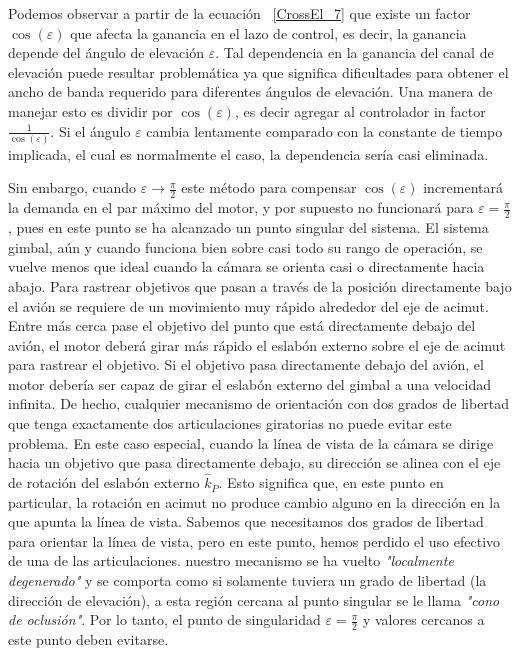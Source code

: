 Podemos observar a partir de la ecuaci\'{o}n ~\ref{CrossEl_7} que existe un factor $\cos \left(\varepsilon \right)$ que afecta la ganancia en el lazo de control, es decir, la ganancia depende del \'{a}ngulo de elevaci\'{o}n $\varepsilon$. Tal dependencia en la ganancia del canal de elevaci\'{o}n puede resultar problem\'{a}tica ya que significa dificultades para obtener el ancho de banda requerido para diferentes \'{a}ngulos de elevaci\'{o}n. Una manera de manejar esto es dividir por $\cos \left(\varepsilon \right)$, es decir agregar al controlador in factor $\frac{1}{\cos \left(\varepsilon \right)}$. Si el \'{a}ngulo $\varepsilon$ cambia lentamente comparado con la constante de tiempo implicada, el cual es normalmente el caso, la dependencia ser\'{i}a casi eliminada.

Sin embargo, cuando $\varepsilon \rightarrow \frac{\pi}{2}$ este m\'{e}todo para compensar $\cos \left(\varepsilon \right)$ incrementar\'{a} la demanda en el par m\'{a}ximo del motor, y por supuesto no funcionar\'{a} para $\varepsilon = \frac{\pi}{2}$, pues en este punto se ha alcanzado un punto singular del sistema. El sistema gimbal, a\'{u}n y cuando funciona bien sobre casi todo su rango de operaci\'{o}n, se vuelve menos que ideal cuando la c\'{a}mara se orienta casi o directamente hacia abajo. Para rastrear objetivos que pasan a trav\'{e}s de la posici\'{o}n directamente bajo el avi\'{o}n se requiere de un movimiento muy r\'{a}pido alrededor del eje de acimut. Entre m\'{a}s cerca pase el objetivo del punto que est\'{a} directamente debajo del avi\'{o}n, el motor deber\'{a} girar m\'{a}s r\'{a}pido el eslab\'{o}n externo sobre el eje de acimut para rastrear el objetivo. Si el objetivo pasa directamente debajo del avi\'{o}n, el motor deber\'{i}a ser capaz de girar el eslab\'{o}n externo del gimbal a una velocidad infinita. De hecho, cualquier mecanismo de orientaci\'{o}n con dos grados de libertad que tenga exactamente dos articulaciones giratorias no puede evitar este problema. En este caso especial, cuando la l\'{i}nea de vista de la c\'{a}mara se dirige hacia un objetivo que pasa directamente debajo, su direcci\'{o}n se alinea con el eje de rotaci\'{o}n del eslab\'{o}n externo $\hat{k}_{P}$. Esto significa que, en este punto en particular, la rotaci\'{o}n en acimut no produce cambio alguno en la direcci\'{o}n en la que apunta la l\'{i}nea de vista. Sabemos que necesitamos dos grados de libertad para orientar la l\'{i}nea de vista, pero en este punto, hemos perdido el uso efectivo de una de las articulaciones. nuestro mecanismo se ha vuelto \textit{"localmente degenerado"} y se comporta como si solamente tuviera un grado de libertad (la direcci\'{o}n de elevaci\'{o}n), a esta regi\'{o}n cercana al punto singular se le llama \textit{"cono de oclusi\'{o}n"}. Por lo tanto, el punto de singularidad $\varepsilon = \frac{\pi}{2}$ y valores cercanos a este punto deben evitarse.

